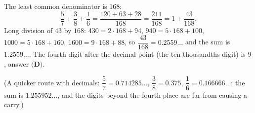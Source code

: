 The least common denominator is $168$:
\[
\dfrac{5}{7}+\dfrac{3}{8}+\dfrac{1}{6}=\dfrac{120+63+28}{168}=\dfrac{211}{168}=1+\dfrac{43}{168}.
\]
Long division of $43$ by $168$: $430=2\cdot168+94$, $940=5\cdot168+100$, $1000=5\cdot168+160$, $1600=9\cdot168+88$, so $\dfrac{43}{168}=0.2559\ldots$ and the sum is $1.2559\ldots$. The fourth digit after the decimal point (the ten-thousandths digit) is $\boxed{9}$, answer $\textbf{(D)}$.

(A quicker route with decimals: $\dfrac{5}{7}=0.714285\ldots$, $\dfrac{3}{8}=0.375$, $\dfrac{1}{6}=0.166666\ldots$; the sum is $1.255952\ldots$, and the digits beyond the fourth place are far from causing a carry.)
